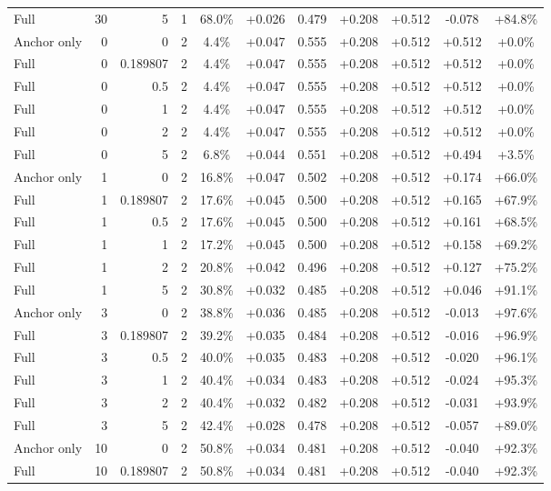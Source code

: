 \begin{table}[htbp]
\begin{tabular}{lrrrccccccc}
Full & 30 & 5 & 1 & 68.0\% & +0.026 & 0.479 & +0.208 & +0.512 & -0.078 & +84.8\% \\
Anchor only & 0 & 0 & 2 & 4.4\% & +0.047 & 0.555 & +0.208 & +0.512 & +0.512 & +0.0\% \\
Full & 0 & 0.189807 & 2 & 4.4\% & +0.047 & 0.555 & +0.208 & +0.512 & +0.512 & +0.0\% \\
Full & 0 & 0.5 & 2 & 4.4\% & +0.047 & 0.555 & +0.208 & +0.512 & +0.512 & +0.0\% \\
Full & 0 & 1 & 2 & 4.4\% & +0.047 & 0.555 & +0.208 & +0.512 & +0.512 & +0.0\% \\
Full & 0 & 2 & 2 & 4.4\% & +0.047 & 0.555 & +0.208 & +0.512 & +0.512 & +0.0\% \\
Full & 0 & 5 & 2 & 6.8\% & +0.044 & 0.551 & +0.208 & +0.512 & +0.494 & +3.5\% \\
Anchor only & 1 & 0 & 2 & 16.8\% & +0.047 & 0.502 & +0.208 & +0.512 & +0.174 & +66.0\% \\
Full & 1 & 0.189807 & 2 & 17.6\% & +0.045 & 0.500 & +0.208 & +0.512 & +0.165 & +67.9\% \\
Full & 1 & 0.5 & 2 & 17.6\% & +0.045 & 0.500 & +0.208 & +0.512 & +0.161 & +68.5\% \\
Full & 1 & 1 & 2 & 17.2\% & +0.045 & 0.500 & +0.208 & +0.512 & +0.158 & +69.2\% \\
Full & 1 & 2 & 2 & 20.8\% & +0.042 & 0.496 & +0.208 & +0.512 & +0.127 & +75.2\% \\
Full & 1 & 5 & 2 & 30.8\% & +0.032 & 0.485 & +0.208 & +0.512 & +0.046 & +91.1\% \\
Anchor only & 3 & 0 & 2 & 38.8\% & +0.036 & 0.485 & +0.208 & +0.512 & -0.013 & +97.6\% \\
Full & 3 & 0.189807 & 2 & 39.2\% & +0.035 & 0.484 & +0.208 & +0.512 & -0.016 & +96.9\% \\
Full & 3 & 0.5 & 2 & 40.0\% & +0.035 & 0.483 & +0.208 & +0.512 & -0.020 & +96.1\% \\
Full & 3 & 1 & 2 & 40.4\% & +0.034 & 0.483 & +0.208 & +0.512 & -0.024 & +95.3\% \\
Full & 3 & 2 & 2 & 40.4\% & +0.032 & 0.482 & +0.208 & +0.512 & -0.031 & +93.9\% \\
Full & 3 & 5 & 2 & 42.4\% & +0.028 & 0.478 & +0.208 & +0.512 & -0.057 & +89.0\% \\
Anchor only & 10 & 0 & 2 & 50.8\% & +0.034 & 0.481 & +0.208 & +0.512 & -0.040 & +92.3\% \\
Full & 10 & 0.189807 & 2 & 50.8\% & +0.034 & 0.481 & +0.208 & +0.512 & -0.040 & +92.3\% \\

\end{tabular}
\end{table}
